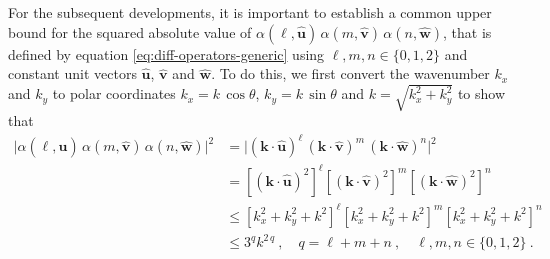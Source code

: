 For the subsequent developments, it is important to establish a common upper bound for
the squared absolute value of 
$\alpha(\ell,\hat{\mathbf{u}}) \, \alpha(m,\hat{\mathbf{v}}) \, \alpha(n,\hat{\mathbf{w}})$,
that is defined by equation \ref{eq:diff-operators-generic} using $\ell, m , n \in \{0, 1, 2\}$
and constant unit vectors $\hat{\mathbf{u}}$, $\hat{\mathbf{v}}$ and $\hat{\mathbf{w}}$. 
To do this, we first convert the wavenumber $k_{x}$ and $k_{y}$ to polar coordinates 
$k_{x} = k \, \cos\theta$, $k_{y} = k \, \sin\theta$ and $k = \sqrt{k_{x}^{2} + k_{y}^{2}}$
to show that
\begin{equation}
	\begin{split}
		\vert \alpha(\ell,\hat{\mathbf{u}}) \, \alpha(m,\hat{\mathbf{v}}) \, \alpha(n,\hat{\mathbf{w}}) \vert^{2} 
		&= \vert (\mathbf{k} \cdot \hat{\mathbf{u}})^{\ell} \, (\mathbf{k} \cdot \hat{\mathbf{v}})^{m} \, (\mathbf{k} \cdot \hat{\mathbf{w}})^{n} \vert^{2} \\
		&= \left[ (\mathbf{k} \cdot \hat{\mathbf{u}})^{2} \right]^{\ell} \left[ (\mathbf{k} \cdot \hat{\mathbf{v}})^{2} \right]^{m} 
		\left[ (\mathbf{k} \cdot \hat{\mathbf{w}})^{2} \right]^{n} \\
		&\le \left[ k_{x}^{2} + k_{y}^{2} + k^{2} \right]^{\ell} \left[ k_{x}^{2} + k_{y}^{2} + k^{2} \right]^{m} 
		\left[ k_{x}^{2} + k_{y}^{2} + k^{2} \right]^{n} \\
		&\le 3^{q} k^{2 \, q} \: , \quad q = \ell+m+n \: ,
		\quad \ell, m , n \in \{0, 1, 2\} \: .
	\end{split}
\label{eq:alpha-upper-bound}
\end{equation}

